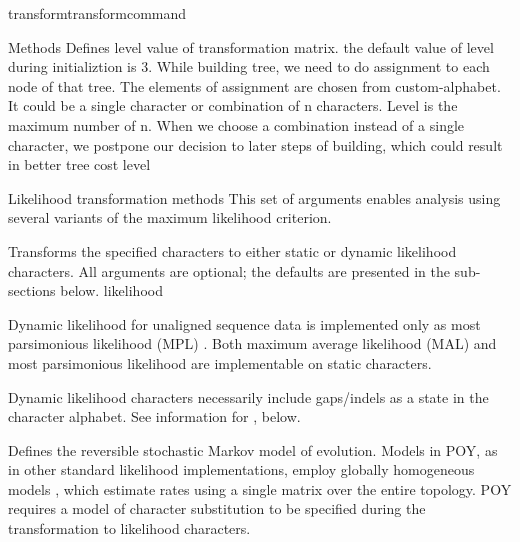 \begin{command}{transform}{transformcommand}
\begin{arguments}
\begin{argumentgroup}{Methods}
            {Defines level value of transformation matrix. the default value of
            level during initializtion is 3. While building tree, we need to
            do assignment to each node of that tree. The elements of assignment
            are chosen from custom-alphabet. It could be a single character or
            combination of n characters.  Level is the maximum number of n.
            When we choose a combination instead of a single character, we
            postpone our decision to later steps of building, which could
            result in better tree cost }
            {level}

        \end{argumentgroup}
         
        \begin{argumentgroup}{Likelihood transformation methods}
            This set of arguments enables analysis using several variants of the
            maximum likelihood criterion. 
           
                {Transforms the specified characters to either static or dynamic
                likelihood characters. All arguments are optional; the defaults
                are presented in the sub-sections below.}
                {likelihood}

            \begin{statement}
                Dynamic likelihood for unaligned sequence data is
                implemented only as most parsimonious likelihood (MPL)
                \cite{barryandhartigan1987}. Both maximum average likelihood (MAL) and
                most parsimonious likelihood are implementable on static
                characters.
            \end{statement}

            \begin{statement}
                Dynamic likelihood characters necessarily include gaps/indels as
                a state in the character alphabet. See information for
                , below.
            \end{statement}

                {Defines the reversible stochastic Markov model of evolution.
                Models in POY, as in other standard likelihood implementations,
                employ globally homogeneous models \cite{jayaswal2005estimation}, which
                estimate rates using a single matrix over the entire topology.
                POY requires a model of character substitution to be specified
                during the transformation to likelihood characters.

}
\end{argumentgroup}
\end{arguments}
\end{command}
